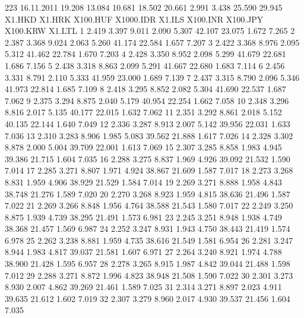 \documentclass[a4paper,11pt]{scrartcl}
\begin{document}
\begin{Schunk}
\begin{Soutput}
223 16.11.2011 19.208 13.084 10.681 18.502 20.661  2.991  3.438 25.590 29.945
    X1.HKD X1.HRK X100.HUF X1000.IDR X1.ILS X100.INR X100.JPY X100.KRW X1.LTL
1    2.419  3.397    9.011     2.090  5.307   42.107   23.075    1.672  7.265
2    2.387  3.368    9.024     2.063  5.260   41.174   22.584    1.657  7.207
3    2.422  3.368    8.976     2.095  5.312   41.462   22.784    1.670  7.203
4    2.428  3.350    8.952     2.098  5.299   41.679   22.681    1.686  7.156
5    2.438  3.318    8.863     2.099  5.291   41.667   22.680    1.683  7.114
6    2.456  3.331    8.791     2.110  5.333   41.959   23.000    1.689  7.139
7    2.437  3.315    8.790     2.096  5.346   41.973   22.814    1.685  7.109
8    2.418  3.295    8.852     2.082  5.304   41.690   22.537    1.687  7.062
9    2.375  3.294    8.875     2.040  5.179   40.954   22.254    1.662  7.058
10   2.348  3.296    8.816     2.017  5.135   40.177   22.015    1.632  7.062
11   2.351  3.292    8.861     2.018  5.152   40.135   22.144    1.640  7.049
12   2.336  3.287    8.913     2.007  5.142   39.956   22.031    1.633  7.036
13   2.310  3.283    8.906     1.985  5.083   39.562   21.888    1.617  7.026
14   2.328  3.302    8.878     2.000  5.004   39.709   22.001    1.613  7.069
15   2.307  3.285    8.858     1.983  4.945   39.386   21.715    1.604  7.035
16   2.288  3.275    8.837     1.969  4.926   39.092   21.532    1.590  7.014
17   2.285  3.271    8.807     1.971  4.924   38.867   21.609    1.587  7.017
18   2.273  3.268    8.831     1.959  4.906   38.929   21.529    1.584  7.014
19   2.269  3.271    8.888     1.958  4.843   38.748   21.276    1.589  7.020
20   2.270  3.268    8.923     1.959  4.815   38.636   21.496    1.587  7.022
21   2.269  3.266    8.848     1.956  4.764   38.588   21.543    1.580  7.017
22   2.249  3.250    8.875     1.939  4.739   38.295   21.491    1.573  6.981
23   2.245  3.251    8.948     1.938  4.749   38.368   21.457    1.569  6.987
24   2.252  3.247    8.931     1.943  4.750   38.443   21.419    1.574  6.978
25   2.262  3.238    8.881     1.959  4.735   38.616   21.549    1.581  6.954
26   2.281  3.247    8.944     1.983  4.817   39.037   21.581    1.607  6.971
27   2.264  3.240    8.921     1.974  4.788   38.900   21.428    1.595  6.957
28   2.278  3.265    8.915     1.987  4.842   39.044   21.488    1.598  7.012
29   2.288  3.271    8.872     1.996  4.823   38.948   21.508    1.590  7.022
30   2.301  3.273    8.930     2.007  4.862   39.269   21.461    1.589  7.025
31   2.314  3.271    8.897     2.023  4.911   39.635   21.612    1.602  7.019
32   2.307  3.279    8.960     2.017  4.930   39.537   21.456    1.604  7.035

\end{Soutput}
\end{Schunk}
\end{document}
